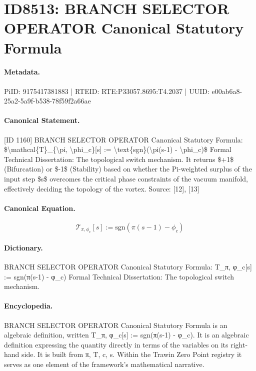 \section*{ID8513: BRANCH SELECTOR OPERATOR Canonical Statutory Formula}
\paragraph{Metadata.}
PiID: 9175417381883 | RTEID: RTE:P33057.8695:T4.2037 | UUID: e00ab6a8-25a2-5a9f-b538-78f59f2a66ae

\paragraph{Canonical Statement.}
[ID 1160] BRANCH SELECTOR OPERATOR Canonical Statutory Formula: \$\textbackslash{}mathcal\{T\}\_\{\textbackslash{}pi, \textbackslash{}phi\_c\}[s] := \textbackslash{}text\{sgn\}(\textbackslash{}pi(s-1) - \textbackslash{}phi\_c)\$ Formal Technical Dissertation: The topological switch mechanism. It returns \$+1\$ (Bifurcation) or \$-1\$ (Stability) based on whether the Pi-weighted surplus of the input step \$s\$ overcomes the critical phase constraints of the vacuum manifold, effectively deciding the topology of the vortex. Source: [12], [13]

\paragraph{Canonical Equation.}
\[
\mathcal{T}_{\pi, \phi_c}[s] := \text{sgn}(\pi(s-1) - \phi_c)
\]

\paragraph{Dictionary.}
BRANCH SELECTOR OPERATOR Canonical Statutory Formula: T\_π, φ\_c[s] := sgn(π(s-1) - φ\_c) Formal Technical Dissertation: The topological switch mechanism.

\paragraph{Encyclopedia.}
BRANCH SELECTOR OPERATOR Canonical Statutory Formula is an algebraic definition, written T\_π, φ\_c[s] := sgn(π(s-1) - φ\_c). It is an algebraic definition expressing the quantity directly in terms of the variables on its right-hand side. It is built from π, T, c, s. Within the Trawin Zero Point registry it serves as one element of the framework's mathematical narrative.
